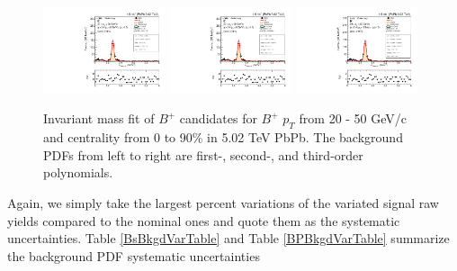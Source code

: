 \begin{figure}[hbtp]
\begin{center}
\includegraphics[width=0.32\textwidth]{Figures/Chapter5/data_PbPb_1_Bpt_2050_1st_doubly0_ntKp.pdf}
\includegraphics[width=0.32\textwidth]{Figures/Chapter5/data_PbPb_1_Bpt_2050_2nd_doubly0_ntKp.pdf}
\includegraphics[width=0.32\textwidth]{Figures/Chapter5/data_PbPb_1_Bpt_2050_3rd_doubly0_ntKp.pdf}
\caption{Invariant mass fit of $B^+$ candidates for $B^+$ $p_T$ from 20 - 50 GeV/c and centrality from 0 to 90\% in 5.02 TeV PbPb. The background PDFs from left to right are first-, second-, and third-order polynomials.}
\label{BPBkgdVar}
\end{center}
\end{figure}

Again, we simply take the largest percent variations of the variated signal raw yields compared to the nominal ones and quote them as the systematic uncertainties. Table \ref{BsBkgdVarTable} and Table \ref{BPBkgdVarTable} summarize the background PDF systematic uncertainties 

